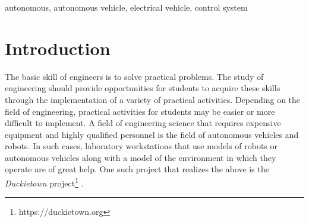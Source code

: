 \documentclass[conference]{IEEEtran}
\begin{document}
\begin{IEEEkeywords}
autonomous, autonomous vehicle, electrical vehicle, control system
\end{IEEEkeywords}
%
\section{Introduction}
The basic skill of engineers is to solve practical problems. The study of engineering should provide opportunities for students to acquire these skills through the implementation of a variety of practical activities. Depending on the field of engineering, practical activities for students may be easier or more difficult to implement. A field of engineering science that requires expensive equipment and highly qualified personnel is the field of autonomous vehicles and robots. 
In such cases, laboratory workstations that use models of robots or autonomous vehicles along with a model of the environment in which they operate are of great help.
One such project that realizes the above is the \emph{Duckietown} project\footnote{https://duckietown.org} \cite{tani2017duckietown}.
\end{document}
